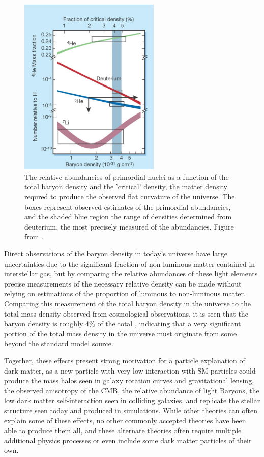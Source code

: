 \begin{figure}[htpb]
	\centering
	\includegraphics[width=0.6\textwidth]{figures/baryogenesis.png}
	\caption[Relative Light Baryon Abundancies]{The relative abundancies of primordial nuclei as a function of the total baryon density and the 'critical' density, the matter density requred to produce the observed flat curvature of the universe. The boxes represent observed estimates of the primordial abundancies, and the shaded blue region the range of densities determined from deuterium, the most precisely measured of the abundancies. Figure from \cite{charbonnel2002}.
	\label{fig:baryogenesis}
	}
\end{figure}

Direct observations of the baryon density in today's universe have large uncertainties due to the significant fraction of non-luminous matter contained in interstellar gas, but by comparing the relative abundances of these light elements precise measurements of the necessary relative density can be made without relying on estimations of the proportion of luminous to non-luminous matter.
Comparing this measurement of the total baryon density in the universe to the total mass density observed from cosmological observations, it is seen that the baryon density is roughly 4\% of the total \cite{Tytler_2000}, indicating that a very significant portion of the total mass density in the universe must originate from some beyond the standard model source.

Together, these effects present strong motivation for a particle explanation of dark matter, as a new particle with very low interaction with SM particles could produce the mass halos seen in galaxy rotation curves and gravitational lensing, the observed anisotropy of the CMB, the relative abundance of light Baryons, the low dark matter self-interaction seen in colliding galaxies, and replicate the stellar structure seen today and produced in simulations.
While other theories can often explain some of these effects, no other commonly accepted theories have been able to produce them all, and these alternate theories often require multiple additional physics processes or even include some dark matter particles of their own.

